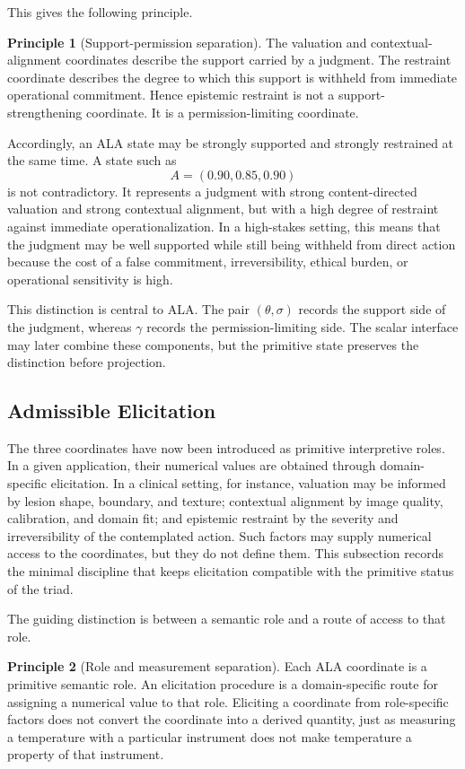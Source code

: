 \documentclass[reqno,final]{amsart}
\theoremstyle{definition}
\newtheorem{principle}{Principle}
\theoremstyle{plain}
\theoremstyle{remark}
\begin{document}
This gives the following principle.

\begin{principle}[Support-permission separation]
The valuation and contextual-alignment coordinates describe the support carried by a judgment. The restraint coordinate describes the degree to which this support is withheld from immediate operational commitment. Hence epistemic restraint is not a support-strengthening coordinate. It is a permission-limiting coordinate.
\end{principle}

Accordingly, an ALA state may be strongly supported and strongly restrained at the same time. A state such as
\[
A=(0.90,0.85,0.90)
\]
is not contradictory. It represents a judgment with strong content-directed valuation and strong contextual alignment, but with a high degree of restraint against immediate operationalization. In a high-stakes setting, this means that the judgment may be well supported while still being withheld from direct action because the cost of a false commitment, irreversibility, ethical burden, or operational sensitivity is high.

This distinction is central to ALA. The pair \((\theta,\sigma)\) records the support side of the judgment, whereas \(\gamma\) records the permission-limiting side. The scalar interface may later combine these components, but the primitive state preserves the distinction before projection.

\subsection{Admissible Elicitation}
\label{subsec:elicitation}

The three coordinates have now been introduced as primitive interpretive roles. In a given application, their numerical values are obtained through domain-specific elicitation. In a clinical setting, for instance, valuation may be informed by lesion shape, boundary, and texture; contextual alignment by image quality, calibration, and domain fit; and epistemic restraint by the severity and irreversibility of the contemplated action. Such factors may supply numerical access to the coordinates, but they do not define them. This subsection records the minimal discipline that keeps elicitation compatible with the primitive status of the triad.

The guiding distinction is between a semantic role and a route of access to that role.

\begin{principle}[Role and measurement separation]
\label{prin:role-measurement}
Each ALA coordinate is a primitive semantic role. An elicitation procedure is a domain-specific route for assigning a numerical value to that role. Eliciting a coordinate from role-specific factors does not convert the coordinate into a derived quantity, just as measuring a temperature with a particular instrument does not make temperature a property of that instrument.
\end{principle}
\end{document}
